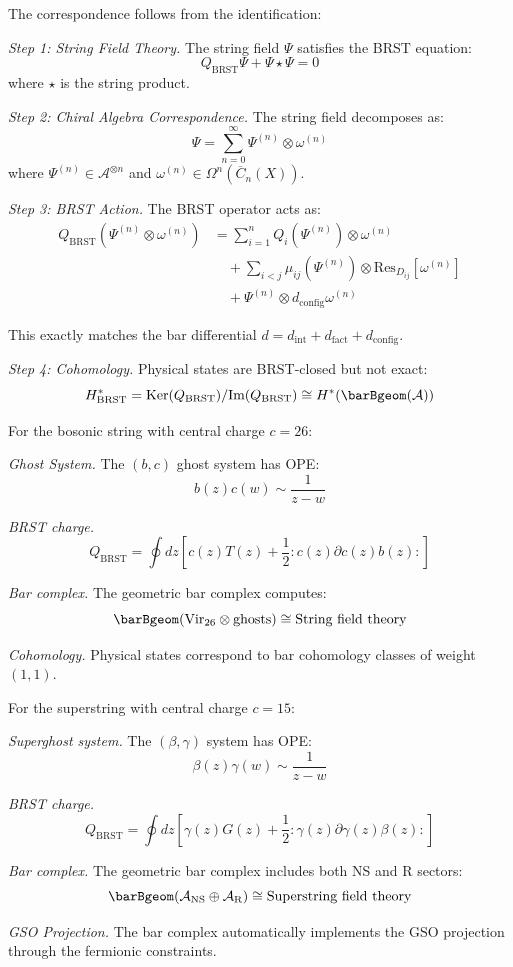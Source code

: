 \begin{remark}
The correspondence follows from the identification:

\emph{Step 1: String Field Theory.} The string field $\Psi$ satisfies the BRST equation:
\[Q_{\text{BRST}} \Psi + \Psi \star \Psi = 0\]
where $\star$ is the string product.

\emph{Step 2: Chiral Algebra Correspondence.} The string field decomposes as:
\[\Psi = \sum_{n=0}^\infty \Psi^{(n)} \otimes \omega^{(n)}\]
where $\Psi^{(n)} \in \mathcal{A}^{\otimes n}$ and $\omega^{(n)} \in \Omega^n(\overline{C}_n(X))$.

\emph{Step 3: BRST Action.} The BRST operator acts as:
\begin{align}
Q_{\text{BRST}}(\Psi^{(n)} \otimes \omega^{(n)}) &= \sum_{i=1}^n Q_i(\Psi^{(n)}) \otimes \omega^{(n)} \\
&\quad + \sum_{i<j} \mu_{ij}(\Psi^{(n)}) \otimes \text{Res}_{D_{ij}}[\omega^{(n)}] \\
&\quad + \Psi^{(n)} \otimes d_{\text{config}}\omega^{(n)}
\end{align}

This exactly matches the bar differential $d = d_{\text{int}} + d_{\text{fact}} + d_{\text{config}}$.

\emph{Step 4: Cohomology.} Physical states are BRST-closed but not exact:
\[H^*_{\text{BRST}} = \text{Ker}(Q_{\text{BRST}})/\text{Im}(Q_{\text{BRST}}) \cong H^*(\barBgeom(\mathcal{A}))\]
\end{remark}

\begin{example}
For the bosonic string with central charge $c = 26$:

\emph{Ghost System.} The $(b,c)$ ghost system has OPE:
\[b(z)c(w) \sim \frac{1}{z-w}\]

\emph{BRST charge.} 
\[Q_{\text{BRST}} = \oint dz \left[ c(z)T(z) + \frac{1}{2}:c(z)\partial c(z)b(z): \right]\]

\emph{Bar complex.} The geometric bar complex computes:
\[\barBgeom(\text{Vir}_{26} \otimes \text{ghosts}) \cong \text{String field theory}\]

\emph{Cohomology.} Physical states correspond to bar cohomology classes of weight $(1,1)$.
\end{example}

\begin{example}
For the superstring with central charge $c = 15$:

\emph{Superghost system.} The $(\beta,\gamma)$ system has OPE:
\[\beta(z)\gamma(w) \sim \frac{1}{z-w}\]

\emph{BRST charge.}
\[Q_{\text{BRST}} = \oint dz \left[ \gamma(z)G(z) + \frac{1}{2}:\gamma(z)\partial\gamma(z)\beta(z): \right]\]

\emph{Bar complex.} The geometric bar complex includes both NS and R sectors:
\[\barBgeom(\mathcal{A}_{\text{NS}} \oplus \mathcal{A}_{\text{R}}) \cong \text{Superstring field theory}\]

\emph{GSO Projection.} The bar complex automatically implements the GSO projection through the fermionic constraints.
\end{example}

